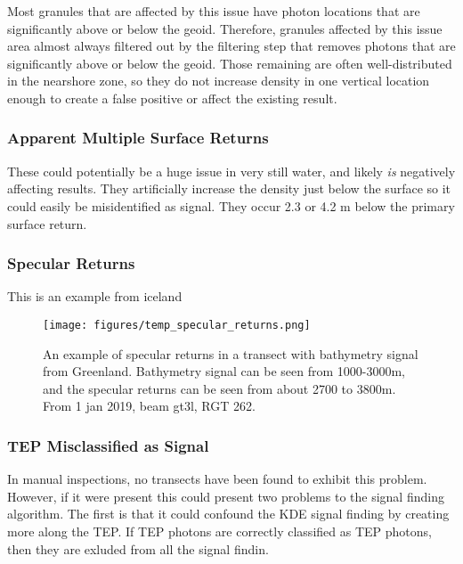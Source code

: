 Most granules that are affected by this issue have photon locations that are significantly above or below the geoid. Therefore, granules affected by this issue area almost always filtered out by the filtering step that removes photons that are significantly above or below the geoid. Those remaining are often well-distributed in the nearshore zone, so they do not increase density in one vertical location enough to create a false positive or affect the existing result. 

\subsubsection{Apparent Multiple Surface Returns}

These could potentially be a huge issue in very still water, and likely \emph{is} negatively affecting results. They artificially increase the density just below the surface so it could easily be misidentified as signal. They occur 2.3 or 4.2 m below the primary surface return.

\subsubsection{Specular Returns}

This is an example from iceland 

\begin{figure}[h!]
    \centering
    \texttt{[image: figures/temp\_specular\_returns.png]}
    \caption{An example of specular returns in a transect with bathymetry signal from Greenland. Bathymetry signal can be seen from 1000-3000m, and the specular returns can be seen from about 2700 to 3800m. From 1 jan 2019, beam gt3l, RGT 262.}
    \label{fig:bathy}
\end{figure}

\subsubsection{TEP Misclassified as Signal}

In manual inspections, no transects have been found to exhibit this problem. However, if it were present this could present two problems to the signal finding algorithm. The first is that it could confound the KDE signal finding by creating more along the TEP. If TEP photons are correctly classified as TEP photons, then they are exluded from all the signal findin. 

